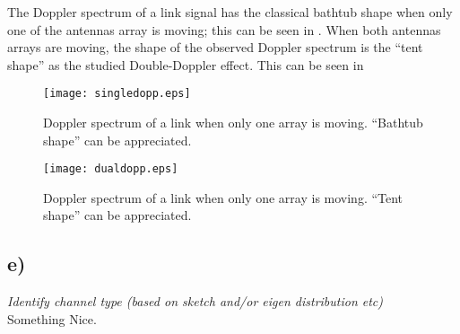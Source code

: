 The Doppler spectrum of a link signal has the classical bathtub shape when only one of the antennas array is moving; this can be seen in . When both antennas arrays are moving, the shape of the observed Doppler spectrum is the ``tent shape'' as the studied Double-Doppler effect. This can be seen in 

\begin{figure}[!h]
  \centering
  \texttt{[image: singledopp.eps]}
  \caption{Doppler spectrum of a link when only one array is moving. ``Bathtub shape'' can be appreciated.}
  \label{fig:singledopp}
\end{figure}

\begin{figure}[!h]
  \centering
  \texttt{[image: dualdopp.eps]}
  \caption{Doppler spectrum of a link when only one array is moving. ``Tent shape'' can be appreciated.}
  \label{fig:dualdopp}
\end{figure}

\subsection{e)}
\textit{Identify channel type (based on sketch and/or eigen distribution etc)}\\

Something Nice. 